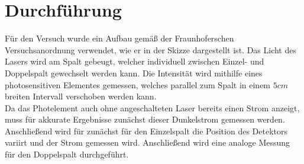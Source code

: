 \section{Durchführung}
Für den Versuch wurde ein Aufbau gemäß der Fraunhoferschen Versuchsanordnung verwendet, wie er in der Skizze dargestellt ist.
Das Licht des Lasers wird am Spalt gebeugt, welcher individuell zwischen Einzel- und Doppelspalt gewechselt werden kann.
Die Intensität wird mithilfe eines photosensitiven Elementes gemessen, welches parallel zum Spalt in einem $5cm$ breiten 
Intervall verschoben werden kann. \\
Da das Photelement auch ohne angeschalteten Laser bereits einen Strom anzeigt, muss für akkurate Ergebnisse zunächst 
dieser Dunkelstrom gemessen werden. Anschließend wird für zunächst für den Einzelspalt die Position des Detektors variirt und
der Strom gemessen wird. Anschließend wird eine analoge Messung für den Doppelspalt durchgeführt.
